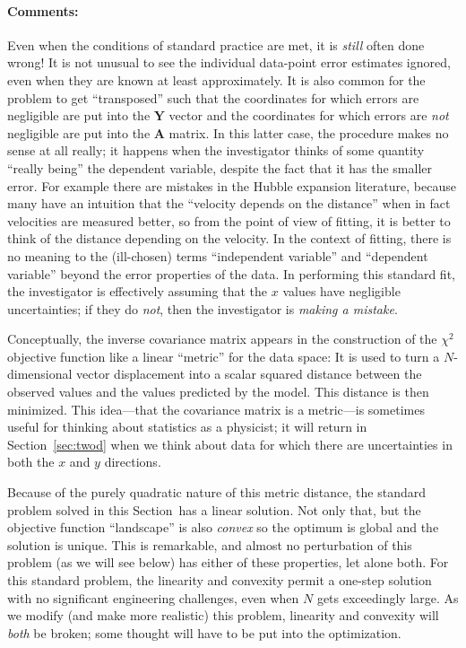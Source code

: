 \documentclass[12pt,twoside]{article}
\newcommand{\sectionname}{Section}
\newcommand{\commentsname}{Comments}
\newcounter{problem}
\newenvironment{comments}{\paragraph{\commentsname:}}{}
\newcommand{\mmatrix}[1]{\boldsymbol{#1}}
\newcommand{\mA}{\mmatrix{A}}
\newcommand{\mY}{\mmatrix{Y}}
\begin{document}
\begin{comments}
Even when the conditions of standard practice are met, it is
\emph{still} often done wrong!  It is not unusual to see the
individual data-point error estimates ignored, even when they are
known at least approximately.  It is also common for the problem to
get ``transposed'' such that the coordinates for which errors are
negligible are put into the $\mY$ vector and the coordinates for which
errors are \emph{not} negligible are put into the $\mA$ matrix.  In
this latter case, the procedure makes no sense at all really; it
happens when the investigator thinks of some quantity ``really being''
the dependent variable, despite the fact that it has the smaller
error.  For example there are mistakes in the Hubble expansion
literature, because many have an intuition that the ``velocity depends
on the distance'' when in fact velocities are measured better, so from
the point of view of fitting, it is better to think of the distance
depending on the velocity.  In the context of fitting, there is no
meaning to the (ill-chosen) terms ``independent variable'' and ``dependent
variable'' beyond the error properties of the data.  In performing
this standard fit, the investigator is effectively assuming that the
$x$ values have negligible uncertainties; if they do \emph{not}, then
the investigator is \emph{making a mistake}.

Conceptually, the inverse covariance matrix appears in the
construction of the $\chi^2$ objective function like a linear
``metric'' for the data space: It is used to turn a $N$-dimensional
vector displacement into a scalar squared distance between the
observed values and the values predicted by the model. This distance
is then minimized.  This idea---that the covariance matrix is a
metric---is sometimes useful for thinking about statistics as a
physicist; it will return in \sectionname~\ref{sec:twod} when we think
about data for which there are uncertainties in both the $x$ and $y$
directions.

Because of the purely quadratic nature of this metric distance, the
standard problem solved in this \sectionname\ has a linear solution.
Not only that, but the objective function ``landscape'' is also
\emph{convex} so the optimum is global and the solution is unique.
This is remarkable, and almost no perturbation of this problem (as we
will see below) has either of these properties, let alone both.  For
this standard problem, the linearity and convexity permit a one-step
solution with no significant engineering challenges, even when $N$
gets exceedingly large.  As we modify (and make more realistic) this
problem, linearity and convexity will \emph{both} be broken; some
thought will have to be put into the optimization.


\end{comments}
\end{document}
